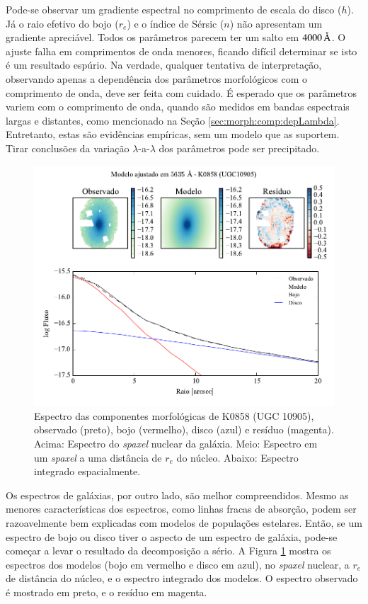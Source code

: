 Pode-se observar um gradiente espectral no comprimento de escala do disco ($h$).
Já o raio efetivo do bojo ($r_e$) e o índice de Sérsic ($n$) não apresentam um
gradiente apreciável. Todos os parâmetros parecem ter um salto em
$4000\,\text{\normalfont\AA}$. O ajuste falha em comprimentos de onda menores, ficando
difícil determinar se isto é um resultado espúrio. Na verdade, qualquer
tentativa de interpretação, observando apenas a dependência dos parâmetros
morfológicos com o comprimento de onda, deve ser feita com cuidado. É esperado
que os parâmetros variem com o comprimento de onda, quando são medidos em bandas
espectrais largas e distantes, como mencionado na Seção
\ref{sec:morph:comp:depLambda}. Entretanto, estas são evidências empíricas, sem
um modelo que as suportem. Tirar conclusões da variação $\lambda$-a-$\lambda$
dos parâmetros pode ser precipitado.

\begin{figure}
	\includegraphics[page=4]{figuras-decomp/K0858_sample006a}
	\caption[Espectro das componentes morfológicas de K0858 (UGC 10905). Acima,
	espectros] {Espectro das componentes morfológicas de K0858 (UGC 10905),
	observado (preto), bojo (vermelho), disco (azul) e resíduo (magenta). Acima:
	Espectro do {\em spaxel} nuclear da galáxia. Meio: Espectro em um {\em spaxel}
	a uma distância de $r_e$ do núcleo. Abaixo: Espectro integrado espacialmente.}
	\label{fig:decompSpectra}
\end{figure}

Os espectros de galáxias, por outro lado, são melhor compreendidos. Mesmo as
menores características dos espectros, como linhas fracas de absorção, podem ser
razoavelmente bem explicadas com modelos de populações estelares. Então, se um
espectro de bojo ou disco tiver o aspecto de um espectro de galáxia, pode-se
começar a levar o resultado da decomposição a sério. A Figura
\ref{fig:decompSpectra} mostra os espectros dos modelos (bojo em vermelho e
disco em azul), no {\em spaxel} nuclear, a $r_e$ de distância do núcleo, e o
espectro integrado dos modelos. O espectro observado é mostrado em preto, e o
resíduo em magenta.


